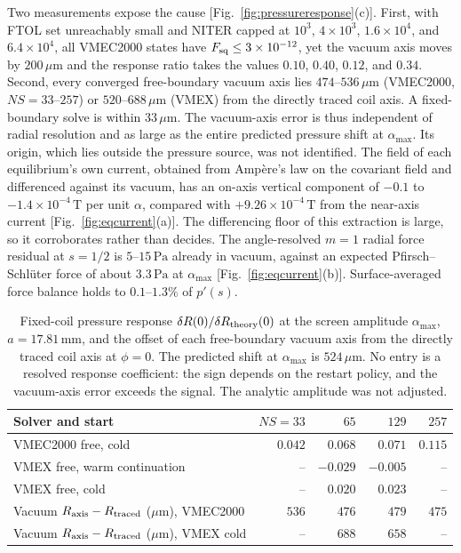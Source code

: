 Two measurements expose the cause [Fig.~\ref{fig:pressureresponse}(c)]. First, with FTOL set unreachably small and NITER capped at $10^3$, $4\times10^3$, $1.6\times10^4$, and $6.4\times10^4$, all VMEC2000 states have $F_{\rm sq}\le3\times10^{-12}$, yet the vacuum axis moves by $200\,\mu\mathrm m$ and the response ratio takes the values $0.10$, $0.40$, $0.12$, and $0.34$. Second, every converged free-boundary vacuum axis lies $474$--$536\,\mu\mathrm m$ (VMEC2000, $NS=33$--$257$) or $520$--$688\,\mu\mathrm m$ (VMEX) from the directly traced coil axis. A fixed-boundary solve is within $33\,\mu\mathrm m$. The vacuum-axis error is thus independent of radial resolution and as large as the entire predicted pressure shift at $\alpha_{\max}$. Its origin, which lies outside the pressure source, was not identified. The field of each equilibrium's own current, obtained from Amp\`ere's law on the covariant field and differenced against its vacuum, has an on-axis vertical component of $-0.1$ to $-1.4\times10^{-4}\,\mathrm{T}$ per unit $\alpha$, compared with $+9.26\times10^{-4}\,\mathrm{T}$ from the near-axis current [Fig.~\ref{fig:eqcurrent}(a)]. The differencing floor of this extraction is large, so it corroborates rather than decides. The angle-resolved $m=1$ radial force residual at $s=1/2$ is $5$--$15\,\mathrm{Pa}$ already in vacuum, against an expected Pfirsch--Schl\"uter force of about $3.3\,\mathrm{Pa}$ at $\alpha_{\max}$ [Fig.~\ref{fig:eqcurrent}(b)]. Surface-averaged force balance holds to $0.1$--$1.3\%$ of $p'(s)$.
\begin{table}[t]
\centering
\begin{tabular}{lrrrr}
\toprule
Solver and start&$NS=33$&$65$&$129$&$257$\\
\midrule
VMEC2000 free, cold&$0.042$&$0.068$&$0.071$&$0.115$\\
VMEX free, warm continuation&--&$-0.029$&$-0.005$&--\\
VMEX free, cold&--&$0.020$&$0.023$&--\\
\midrule
Vacuum $R_{\rm axis}-R_{\rm traced}$ ($\mu$m), VMEC2000&$536$&$476$&$479$&$475$\\
Vacuum $R_{\rm axis}-R_{\rm traced}$ ($\mu$m), VMEX cold&--&$688$&$658$&--\\
\bottomrule
\end{tabular}
\caption{Fixed-coil pressure response $\delta R(0)/\delta R_{\rm theory}(0)$ at the screen amplitude $\alpha_{\max}$, $a=17.81\,\mathrm{mm}$, and the offset of each free-boundary vacuum axis from the directly traced coil axis at $\phi=0$. The predicted shift at $\alpha_{\max}$ is $524\,\mu\mathrm m$. No entry is a resolved response coefficient: the sign depends on the restart policy, and the vacuum-axis error exceeds the signal. The analytic amplitude was not adjusted.}
\label{tab:pressurescan}
\end{table}

